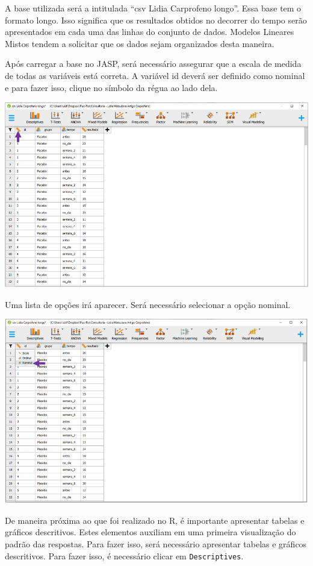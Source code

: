 \documentclass[
]{book}
\begin{document}
A base utilizada será a intitulada ``csv Lidia Carprofeno longo''. Essa base tem o formato longo. Isso significa que os resultados obtidos no decorrer do tempo serão apresentados em cada uma das linhas do conjunto de dados. Modelos Lineares Mistos tendem a solicitar que os dados sejam organizados desta maneira.

Após carregar a base no JASP, será necessário assegurar que a escala de medida de todas as variáveis está correta. A variável id deverá ser definido como nominal e para fazer isso, clique no símbolo da régua ao lado dela.

\includegraphics{./img/cap_lmm_nivel_medida.png}

Uma lista de opções irá aparecer. Será necessário selecionar a opção nominal.

\includegraphics{./img/cap_lmm_nivel_medida2.png}

De maneira próxima ao que foi realizado no R, é importante apresentar tabelas e gráficos descritivos. Estes elementos auxiliam em uma primeira visualização do padrão das respostas. Para fazer isso, será necessário apresentar tabelas e gráficos descritivos. Para fazer isso, é necessário clicar em \texttt{Descriptives}.
\end{document}
